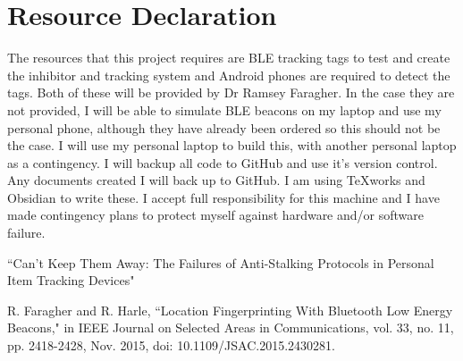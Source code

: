 \documentclass[12pt]{article}
\begin{document}
\section{Resource Declaration}

The resources that this project requires are BLE tracking tags to test and create the inhibitor and tracking system and
Android phones are required to detect the tags.
Both of these will be provided by Dr Ramsey Faragher. 
In the case they are not provided, I will be able to simulate BLE beacons on my laptop and use my personal phone, although they have already been ordered so this should not be the case.
I will use my personal laptop to build this, with another personal laptop as a contingency. I will backup all code to GitHub and use it's version control. Any documents created I will back up to GitHub. I am using TeXworks and Obsidian to write these.
I accept full responsibility for this machine and I have made contingency plans to protect myself against hardware and/or software failure.


\begin{thebibliography}{9}
``Can’t Keep Them Away: The Failures of
Anti-Stalking Protocols in Personal Item Tracking Devices"

R. Faragher and R. Harle, ``Location Fingerprinting With Bluetooth Low Energy Beacons," in IEEE Journal on Selected Areas in Communications, vol. 33, no. 11, pp. 2418-2428, Nov. 2015, doi: 10.1109/JSAC.2015.2430281.
\end{thebibliography}
\end{document}
